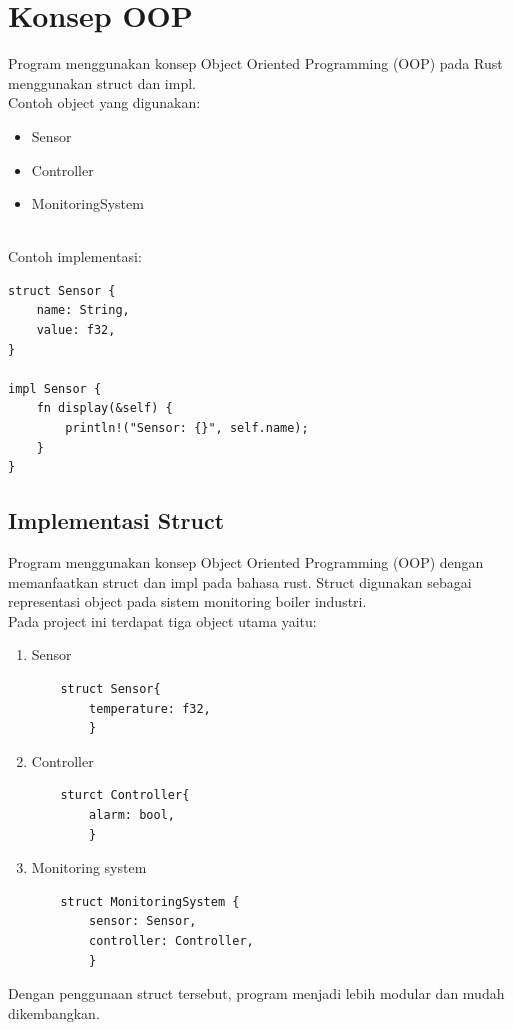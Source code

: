 \documentclass[a4paper,12pt]{article}
\begin{document}

\section{Konsep OOP}

Program menggunakan konsep Object Oriented Programming (OOP) pada Rust menggunakan struct dan impl.\\

Contoh object yang digunakan:
\begin{itemize}
    \item Sensor
    \item Controller
    \item MonitoringSystem
\end{itemize}
\\
Contoh implementasi:

\begin{verbatim}
struct Sensor {
    name: String,
    value: f32,
}

impl Sensor {
    fn display(&self) {
        println!("Sensor: {}", self.name);
    }
}
\end{verbatim}
\subsection{Implementasi Struct}
Program menggunakan konsep Object Oriented Programming (OOP) dengan memanfaatkan struct dan impl pada bahasa rust. Struct digunakan sebagai representasi object pada sistem monitoring boiler industri.\\

Pada project ini terdapat tiga object utama yaitu:
\begin{enumerate}
    \item Sensor
    \begin{verbatim}
    struct Sensor{
        temperature: f32,
        }
    \end{verbatim}
    \item Controller
    \begin{verbatim}
    sturct Controller{
        alarm: bool,
        }
    \end{verbatim}
    \item Monitoring system
    \begin{verbatim}
    struct MonitoringSystem {
        sensor: Sensor,
        controller: Controller,
        }
    \end{verbatim}
\end{enumerate}
Dengan penggunaan struct tersebut, program menjadi lebih modular dan mudah dikembangkan.
\end{document}
